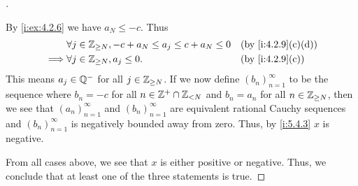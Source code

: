 \begin{proof}[]
\begin{itemize}
          By \cref{i:ex:4.2.6} we have \(a_N \leq -c\).
          Thus
          \begin{align*}
                     & \forall j \in \Z_{\geq N}, -c + a_N \leq a_j \leq c + a_N \leq 0 &  & \by{i:4.2.9}[c,d] \\
            \implies & \forall j \in \Z_{\geq N}, a_j \leq 0.                           &  & \by{i:4.2.9}[c]
          \end{align*}
          This means \(a_j \in \mathbb{Q}^-\) for all \(j \in \mathbb{Z}_{\geq N}\).
          If we now define \((b_n)_{n = 1}^\infty\) to be the sequence where \(b_n = -c\) for all \(n \in \mathbb{Z}^+ \cap \mathbb{Z}_{< N}\) and \(b_n = a_n\) for all \(n \in \mathbb{Z}_{\geq N}\), then we see that \((a_n)_{n = 1}^\infty\) and \((b_n)_{n = 1}^\infty\) are equivalent rational Cauchy sequences and \((b_n)_{n = 1}^\infty\) is negatively bounded away from zero.
          Thus, by \cref{i:5.4.3} \(x\) is negative.
  \end{itemize}
  From all cases above, we see that \(x\) is either positive or negative.
  Thus, we conclude that at least one of the three statements is true.


\end{proof}
